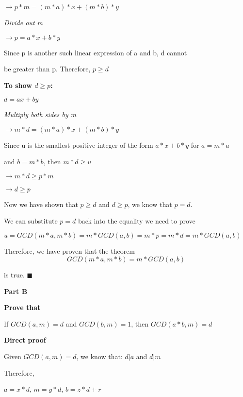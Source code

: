 \documentclass{report}
\begin{document}
    $\rightarrow p*m = (m*a)*x + (m*b)*y$
    
    \textit{Divide out m}
    
    $\rightarrow p = a*x + b*y$
    
    Since p is another such linear expression of a and b, d cannot
    
    be greater than p. Therefore, $p \geq d$
    
    \medskip
    
    \textbf{To show $d \geq p$:}
    
    $d = ax + by$
    
    \textit{Multiply both sides by m}
    
    $\rightarrow m*d = (m*a)*x + (m*b)*y$
    
    Since u is the smallest positive integer of the form $a*x+b*y$ for $a=m*a$
    
    and $b=m*b$, then $m*d \geq u$
    
    $\rightarrow m*d \geq p*m$
    
    $\rightarrow d \geq p$
    
    \bigskip
    
    Now we have shown that $p \geq d$ and $d \geq p$, we know that $p = d$.
    
    We can substitute $p=d$ back into the equality we need to prove
    
    $u = GCD(m*a, m*b) = m*GCD(a,b) = m*p = m*d = m*GCD(a,b)$
    
    \medskip
    
    Therefore, we have proven that the theorem $$GCD(m*a,m*b)=m*GCD(a,b)$$ 
    
    is true. 
    $\blacksquare$
    
    \bigskip
    
    \centerline{\textbf{Part B}}
    
    \centerline{\textbf{Prove that}} 
    
    \medskip
    
    \centerline{If $GCD(a,m) = d$ and $GCD(b,m) = 1$, then $GCD(a*b,m) = d$}
    
    \bigskip
    
    \textbf{Direct proof}
    
    Given $GCD(a,m) = d$, we know that: $d | a$ and $d | m$
    
    Therefore, 
    
    $a = x*d$,
    $m = y*d$,
    $b = z*d + r$ 
    
\end{document}
